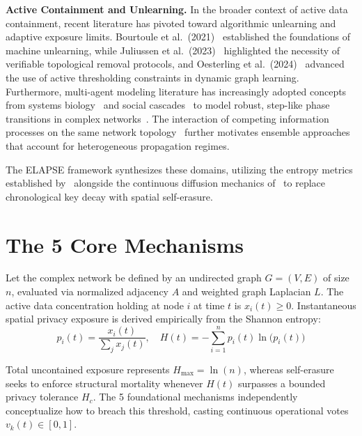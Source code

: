 \documentclass[conference]{IEEEtran}
\begin{document}
\textbf{Active Containment and Unlearning.} In the broader context of active data
containment, recent literature has pivoted toward algorithmic unlearning and adaptive
exposure limits. Bourtoule et al.\ (2021)~\cite{bourtoule2021machine} established the
foundations of machine unlearning, while Juliussen et al.\
(2023)~\cite{juliussen2023algorithms} highlighted the necessity of verifiable
topological removal protocols, and Oesterling et al.\ (2024)~\cite{oesterling2024fair}
advanced the use of active thresholding constraints in dynamic graph learning.
Furthermore, multi-agent modeling literature has increasingly adopted concepts from
systems biology~\cite{alon2019systems} and social cascades~\cite{watts2002simple} to
model robust, step-like phase transitions in complex
networks~\cite{guilbeault2018complex}. The interaction of competing information processes
on the same network topology~\cite{karrer2011competing} further motivates ensemble
approaches that account for heterogeneous propagation regimes.

The ELAPSE framework synthesizes these domains, utilizing the entropy metrics established
by~\cite{zhao2024multi} alongside the continuous diffusion mechanics
of~\cite{eliasof2024graph} to replace chronological key decay with spatial self-erasure.

\section{The 5 Core Mechanisms}
\label{sec:mechanisms}

Let the complex network be defined by an undirected graph $G = (V, E)$ of size $n$,
evaluated via normalized adjacency $A$ and weighted graph Laplacian $L$. The active data
concentration holding at node $i$ at time $t$ is $x_i(t) \geq 0$. Instantaneous
spatial privacy exposure is derived empirically from the Shannon entropy:
\begin{equation}
  p_i(t) = \frac{x_i(t)}{\sum_j x_j(t)}, \quad
  H(t) = -\sum_{i=1}^{n} p_i(t)\ln\!\bigl(p_i(t)\bigr)
  \label{eq:entropy}
\end{equation}

Total uncontained exposure represents $H_{\max} = \ln(n)$, whereas self-erasure seeks
to enforce structural mortality whenever $H(t)$ surpasses a bounded privacy tolerance
$H_c$. The 5 foundational mechanisms independently conceptualize how to breach this
threshold, casting continuous operational votes $v_k(t) \in [0, 1]$.
\end{document}
